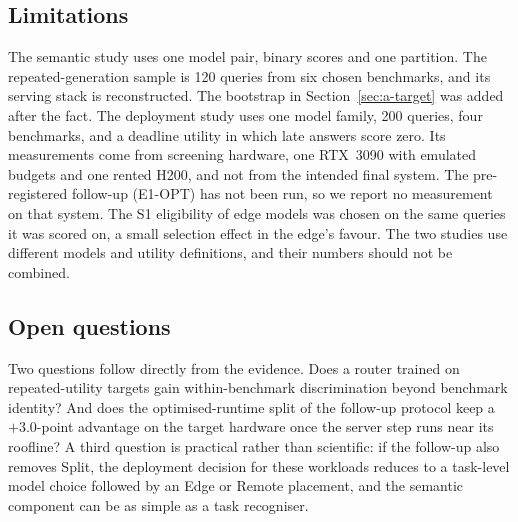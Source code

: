\documentclass[lettersize,journal]{IEEEtran}
\begin{document}
\subsection{Limitations}
The semantic study uses one model pair, binary scores and one partition. The repeated-generation sample is 120 queries from six chosen benchmarks, and its serving stack is reconstructed. The bootstrap in Section~\ref{sec:a-target} was added after the fact. The deployment study uses one model family, 200 queries, four benchmarks, and a deadline utility in which late answers score zero. Its measurements come from screening hardware, one RTX~3090 with emulated budgets and one rented H200, and not from the intended final system. The pre-registered follow-up (E1-OPT) has not been run, so we report no measurement on that system. The S1 eligibility of edge models was chosen on the same queries it was scored on, a small selection effect in the edge's favour. The two studies use different models and utility definitions, and their numbers should not be combined.

\subsection{Open questions}
Two questions follow directly from the evidence. Does a router trained on repeated-utility targets gain within-benchmark discrimination beyond benchmark identity? And does the optimised-runtime split of the follow-up protocol keep a $+3.0$-point advantage on the target hardware once the server step runs near its roofline? A third question is practical rather than scientific: if the follow-up also removes Split, the deployment decision for these workloads reduces to a task-level model choice followed by an Edge or Remote placement, and the semantic component can be as simple as a task recogniser.

\end{document}
